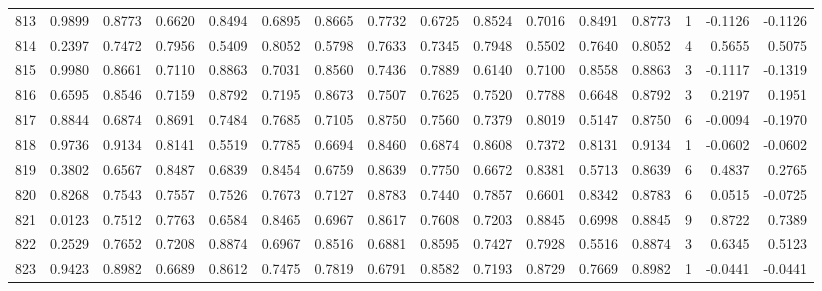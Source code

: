 \begin{tabular}{lrrrrrrrrrrrrrrr}
813 &      0.9899 &  0.8773 &  0.6620 &  0.8494 &  0.6895 &  0.8665 &  0.7732 &  0.6725 &  0.8524 &  0.7016 &   0.8491 &     0.8773 &      1 &                   -0.1126 &                    -0.1126 \\
814 &      0.2397 &  0.7472 &  0.7956 &  0.5409 &  0.8052 &  0.5798 &  0.7633 &  0.7345 &  0.7948 &  0.5502 &   0.7640 &     0.8052 &      4 &                    0.5655 &                     0.5075 \\
815 &      0.9980 &  0.8661 &  0.7110 &  0.8863 &  0.7031 &  0.8560 &  0.7436 &  0.7889 &  0.6140 &  0.7100 &   0.8558 &     0.8863 &      3 &                   -0.1117 &                    -0.1319 \\
816 &      0.6595 &  0.8546 &  0.7159 &  0.8792 &  0.7195 &  0.8673 &  0.7507 &  0.7625 &  0.7520 &  0.7788 &   0.6648 &     0.8792 &      3 &                    0.2197 &                     0.1951 \\
817 &      0.8844 &  0.6874 &  0.8691 &  0.7484 &  0.7685 &  0.7105 &  0.8750 &  0.7560 &  0.7379 &  0.8019 &   0.5147 &     0.8750 &      6 &                   -0.0094 &                    -0.1970 \\
818 &      0.9736 &  0.9134 &  0.8141 &  0.5519 &  0.7785 &  0.6694 &  0.8460 &  0.6874 &  0.8608 &  0.7372 &   0.8131 &     0.9134 &      1 &                   -0.0602 &                    -0.0602 \\
819 &      0.3802 &  0.6567 &  0.8487 &  0.6839 &  0.8454 &  0.6759 &  0.8639 &  0.7750 &  0.6672 &  0.8381 &   0.5713 &     0.8639 &      6 &                    0.4837 &                     0.2765 \\
820 &      0.8268 &  0.7543 &  0.7557 &  0.7526 &  0.7673 &  0.7127 &  0.8783 &  0.7440 &  0.7857 &  0.6601 &   0.8342 &     0.8783 &      6 &                    0.0515 &                    -0.0725 \\
821 &      0.0123 &  0.7512 &  0.7763 &  0.6584 &  0.8465 &  0.6967 &  0.8617 &  0.7608 &  0.7203 &  0.8845 &   0.6998 &     0.8845 &      9 &                    0.8722 &                     0.7389 \\
822 &      0.2529 &  0.7652 &  0.7208 &  0.8874 &  0.6967 &  0.8516 &  0.6881 &  0.8595 &  0.7427 &  0.7928 &   0.5516 &     0.8874 &      3 &                    0.6345 &                     0.5123 \\
823 &      0.9423 &  0.8982 &  0.6689 &  0.8612 &  0.7475 &  0.7819 &  0.6791 &  0.8582 &  0.7193 &  0.8729 &   0.7669 &     0.8982 &      1 &                   -0.0441 &                    -0.0441 \\

\end{tabular}

